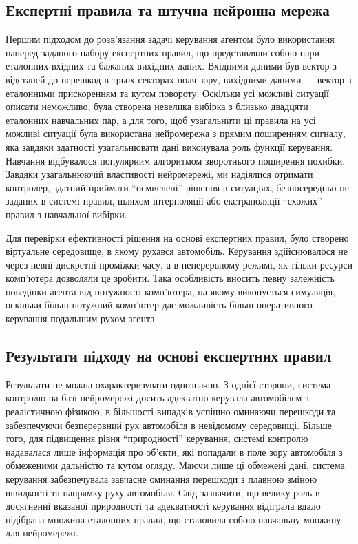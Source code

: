 \documentclass[a4paper,10pt,fleqn]{article}
\begin{document}
\subsection{Експертні правила та штучна нейронна мережа}

Першим підходом до розв'язання задачі керування агентом було використання наперед заданого набору експертних правил, що представляли собою пари еталонних вхідних та бажаних вихідних даних. Вхідними даними був вектор з відстаней до перешкод в трьох секторах поля зору, вихідними даними --- вектор з еталонними прискоренням та кутом повороту. Оскільки усі можливі ситуації описати неможливо, була створена невелика вибірка з близько двадцяти еталонних навчальних пар, а для того, щоб узагальнити ці правила на усі можливі ситуації була використана нейромережа з прямим поширенням сигналу, яка завдяки здатності узагальнювати дані виконувала роль функції керування. Навчання відбувалося популярним алгоритмом зворотнього поширення похибки. Завдяки узагальнюючій властивості нейромережі, ми надіялися отримати контролер, здатний приймати ``осмислені'' рішення в ситуаціях, безпосередньо не заданих в системі правил, шляхом інтерполяції або екстраполяції ``схожих'' правил з навчальної вибірки.

Для перевірки ефективності рішення на основі експертних правил, було створено віртуальне середовище, в якому рухався автомобіль. Керування здійснювалося не через певні дискретні проміжки часу, а в неперервному режимі, як тільки ресурси комп'ютера дозволяли це зробити. Така особливість вносить певну залежність поведінки агента від потужності комп'ютера, на якому виконується симуляція, оскільки більш потужний комп'ютер дає можливість більш оперативного керування подальшим рухом агента. 

\subsection{Результати підходу на основі експертних правил}

Результати не можна охарактеризувати однозначно. З однієї сторони, система контролю на базі нейромережі досить адекватно керувала автомобілем з реалістичною фізикою, в більшості випадків успішно оминаючи перешкоди та забезпечуючи безперервний рух автомобіля в невідомому середовищі. Більше того, для підвищення рівня ``природності'' керування, системі контролю надавалася лише інформація про об'єкти, які попадали в поле зору автомобіля з обмеженими дальністю та кутом огляду. Маючи лише ці обмежені дані, система керування забезпечувала завчасне оминання перешкоди з плавною зміною швидкості та напрямку руху автомобіля. Слід зазначити, що велику роль в досягненні вказаної природності та адекватності керування відіграла вдало підібрана множина еталонних правил, що становила собою навчальну множину для нейромережі.
\end{document}
